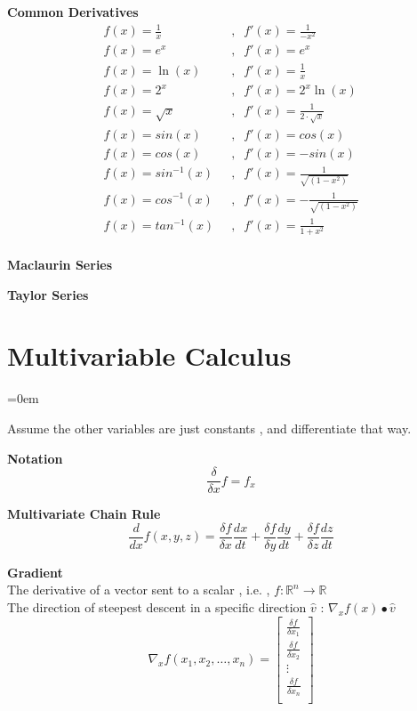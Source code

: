 \textbf{Common Derivatives}
\[
\begin{aligned}
	f(x) = \frac{1}{x} \;\; & , \;\; f'(x) = \frac{1}{-x^2} \\
	f(x) = e^x         \;\; & , \;\; f'(x) = e^x \\
	f(x) = \ln(x)      \;\; & , \;\; f'(x) = \frac{1}{x} \\
	f(x) = 2^x         \;\; & , \;\; f'(x) = 2^x \ln{(x)} \\
	f(x) = \sqrt{x}    \;\; & , \;\; f'(x) = \frac{1}{2 \cdot \sqrt{x}} \\
	f(x) = sin(x)      \;\; & , \;\; f'(x) = cos(x) \\
	f(x) = cos(x)      \;\; & , \;\; f'(x) = -sin(x) \\
	f(x) = sin^{-1}(x) \;\; & , \;\; f'(x) =  \frac{1}{\sqrt{(1-x^{2})}}\\
	f(x) = cos^{-1}(x) \;\; & , \;\; f'(x) =  -\frac{1}{\sqrt{(1-x^{2})}}\\
	f(x) = tan^{-1}(x) \;\; & , \;\; f'(x) =  \frac{1}{1+x^2}\\
\end{aligned}
\]

\textbf{Maclaurin Series}

\textbf{Taylor Series}

\sectionend

\section{Multivariable Calculus}
\label{sec:multivariable_calculus}
\parindent=0em

Assume the other variables are just constants , and differentiate that way.

\textbf{Notation }
\[
	\frac{\delta}{\delta x}f = f_x
\]

\textbf{Multivariate Chain Rule}
\[
	\frac{d}{dx} f(x,y,z) =
	\frac{\delta f}{\delta x}\frac{dx}{dt} +
	\frac{\delta f}{\delta y}\frac{dy}{dt} +
	\frac{\delta f}{\delta z}\frac{dz}{dt}
\]

\textbf{Gradient} \\
The derivative of a vector sent to a scalar , i.e. , \( f: \mathbb{R}^n \rightarrow \mathbb{R}  \)\\

The direction of steepest descent in a specific direction \( \hat{v} \) : \( \nabla_x f(x) \bullet \hat{v} \)
\[
	\nabla_x f(x_1,x_2,\ldots,x_n) = 
	\left[ {
		\begin{array}{c}
			\frac{\delta f}{\delta x_1} \\
			\frac{\delta f}{\delta x_2} \\
			\vdots \\
			\frac{\delta f}{\delta x_n} \\
		\end{array}
	} \right]
\]

